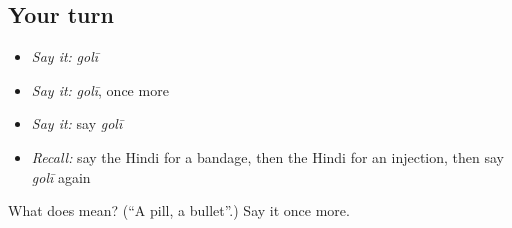 \subsection*{Your turn}
\begin{itemize}
\raggedright
  \item \emph{Say it:} \emph{golī}
  \item \emph{Say it:} \emph{golī}, once more
  \item \emph{Say it:} say \emph{golī}
  \item \emph{Recall:} say the Hindi for a bandage, then the Hindi for an injection, then say \emph{golī} again
\end{itemize}

\begin{tcolorbox}[breakable,colback=teal!4,colframe=teal!35!black,title={Before you move on}]
What does  mean? (\textquotedblleft{}A pill, a bullet\textquotedblright{}.) Say it once more.
\end{tcolorbox}
